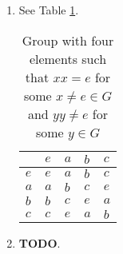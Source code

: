 \documentclass{article}
\begin{document}
\begin{enumerate}
\begin{table}[!ht]
            \caption{Group with four elements such that $xx = e$ for every $x \in G$}
            \label{tab:group-4-self-inverses}
        \end{table}
    \item See Table \ref{tab:group-4-one-not-self-inverse}.
        \begin{table}[]
            \centering
            \begin{tabular}{l|llll}
            &$e$&$a$&$b$&$c$\\ \hline
            $e$&$e$&$a$&$b$&$c$\\
            $a$&$a$&$b$&$c$&$e$\\
            $b$&$b$&$c$&$e$&$a$\\
            $c$&$c$&$e$&$a$&$b$
            \end{tabular}
            \caption{Group with four elements such that $xx = e$ for some $x \ne e \in G$ and $yy \ne e$ for some $y \in G$}
            \label{tab:group-4-one-not-self-inverse}
        \end{table}
    \item \textbf{TODO}.
\end{enumerate}
\end{document}
